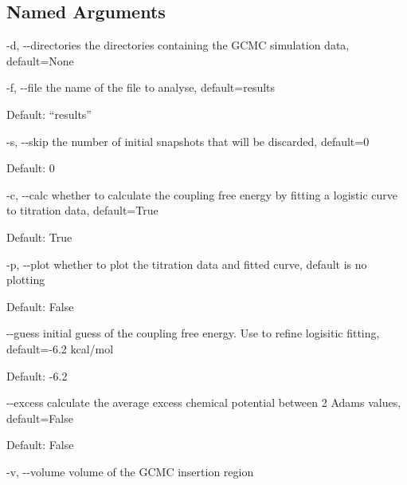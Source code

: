 \documentclass[letterpaper,10pt,english]{sphinxmanual}
\begin{document}
\subsection{Named Arguments}
\label{\detokenize{tools:Named Arguments}}\begin{optionlist}{3cm}
\item [-d, -{-}directories]  
the directories containing the GCMC simulation data, default=None
\item [-f, -{-}file]  
the name of the file to analyse, default=results

Default: “results”
\item [-s, -{-}skip]  
the number of initial snapshots that will be discarded, default=0

Default: 0
\item [-c, -{-}calc]  
whether to calculate the coupling free energy by fitting a logistic curve to titration data, default=True

Default: True
\item [-p, -{-}plot]  
whether to plot the titration data and fitted curve, default is no plotting

Default: False
\item [-{-}guess]  
initial guess of the coupling free energy. Use to refine logisitic fitting, default=-6.2 kcal/mol

Default: -6.2
\item [-{-}excess]  
calculate the average excess chemical potential between 2 Adams values, default=False

Default: False
\item [-v, -{-}volume]  
volume of the GCMC insertion region
\end{optionlist}


%
\begin{sphinxVerbatim}[commandchars=\\\{\}]
   
     
   
\end{sphinxVerbatim}
\end{document}
